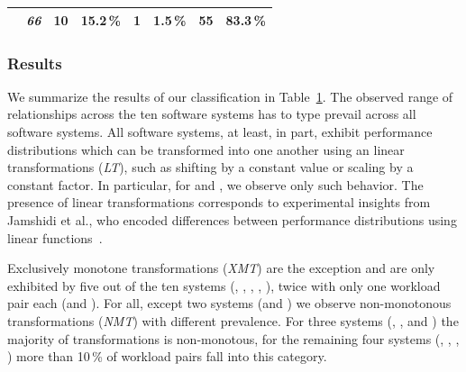 {\begin{table}
\begin{tabular}{p{1.1cm}rrrrrrr}
	\zdrei & \textit{66} &
	\cellcolor{lt-color!15!white}10 & \cellcolor{lt-color!15!white}15.2\,\% & 
	\cellcolor{xmt-color!2!white}1 & \cellcolor{xmt-color!2!white}1.5\,\% & 
	\cellcolor{nmt-color!83!white}55 & \cellcolor{nmt-color!83!white}83.3\,\%\\
	
	\bottomrule
	\end{tabular}
	\label{tab:categorization_counts}
\end{table}

\subsubsection{Results}
{\color{edited}
We summarize the results of our classification in Table~\ref{tab:categorization_counts}. The observed range of relationships across the ten software systems has to type prevail across all software systems. 
All software systems, at least, in part, exhibit performance distributions which can be transformed into one another using an linear transformations (\textit{\colorbox{lt-color}{LT}}), such as shifting by a constant value or scaling by a constant factor. In particular, for \jumper and \xzwo, we observe only such behavior. The presence of linear transformations corresponds to experimental insights from Jamshidi et al., who encoded differences between performance distributions using linear functions~\cite{jamishidi_transfer_2017}.

Exclusively monotone transformations (\textit{\colorbox{xmt-color}{XMT}}) are the exception and are only exhibited by five out of the ten systems (\kanzi, \batik, \xz, \lrzip, \zdrei), twice with only one workload pair each (\xz and \zdrei).  
For all, except two systems (\jumper and \xzwo) we observe non-monotonous transformations (\textit{\colorbox{nmt-color}{NMT}}) with different prevalence.  For three systems (\dconvert, \htwo, and \zdrei) the majority of transformations is non-monotous, for the remaining four systems (\kanzi, \batik, \xz, \lrzip) more than 10\,\% of workload pairs fall into this category.

\vspace{1mm}

}}
